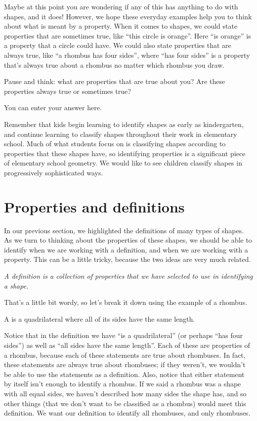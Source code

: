 \documentclass{ximera}
\begin{document}
Maybe at this point you are wondering if any of this has anything to do with shapes, and it does! However, we hope these everyday examples help you to think about what is meant by a property. When it comes to shapes, we could state properties that are sometimes true, like ``this circle is orange''. Here ``is orange'' is a property that a circle could have. We could also state properties that are always true, like ``a rhombus has four sides'', where ``has four sides'' is a property that's always true about a rhombus no matter which rhombus you draw.

\begin{question}
Pause and think: what are properties that are true about you? Are these properties always true or sometimes true?
\begin{freeResponse}
You can enter your answer here.
\end{freeResponse}
\end{question}

Remember that kids begin learning to identify shapes as early as kindergarten, and continue learning to classify shapes throughout their work in elementary school. Much of what students focus on is classifying shapes according to properties that these shapes have, so identifying properties is a significant piece of elementary school geometry. We would like to see children classify shapes in progressively sophisticated ways.

\section{Properties and definitions}

In our previous section, we highlighted the definitions of many types of shapes. As we turn to thinking about the properties of these shapes, we should be able to identify when we are working with a definition, and when we are working with a property. This can be a little tricky, because the two ideas are very much related.

\begin{center}
\emph{A definition is a collection of properties that we have selected to use in identifying a shape.}
\end{center}

That's a little bit wordy, so let's break it down using the example of a rhombus.
\begin{definition}
A  is a quadrilateral where all of its sides have the same length. 
\end{definition}
Notice that in the definition we have ``is a quadrilateral'' (or perhaps ``has four sides'') as well as ``all sides have the same length''. Each of these are properties of a rhombus, because each of these statements are true about rhombuses. In fact, these statements are always true about rhombuses; if they weren't, we wouldn't be able to use the statements as a definition. Also, notice that either statement by itself isn't enough to identify a rhombus. If we said a rhombus was a shape with all equal sides, we haven't described how many sides the shape has, and so other things (that we don't want to be classified as a rhombus) would meet this definition. We want our definition to identify all rhombuses, and only rhombuses.
\end{document}

